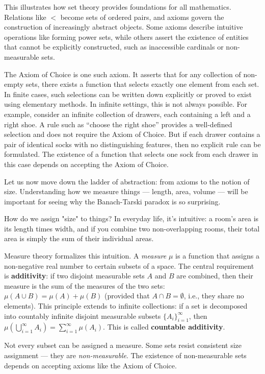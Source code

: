 This illustrates how set theory provides foundations for all mathematics. Relations like $<$ become sets of ordered pairs, and axioms govern the construction of increasingly abstract objects. Some axioms describe intuitive operations like forming power sets, while others assert the existence of entities that cannot be explicitly constructed, such as inaccessible cardinals or non-measurable sets.

The Axiom of Choice is one such axiom. It asserts that for any collection of non-empty sets, there exists a function that selects exactly one element from each set. In finite cases, such selections can be written down explicitly or proved to exist using elementary methods. In infinite settings, this is not always possible. For example, consider an infinite collection of drawers, each containing a left and a right shoe. A rule such as “choose the right shoe” provides a well-defined selection and does not require the Axiom of Choice. But if each drawer contains a pair of identical socks with no distinguishing features, then no explicit rule can be formulated. The existence of a function that selects one sock from each drawer in this case depends on accepting the Axiom of Choice.

Let us now move down the ladder of abstraction: from axioms to the notion of size. Understanding how we measure things — length, area, volume — will be important for seeing why the Banach-Tarski paradox is so surprising.

How do we assign "size" to things? In everyday life, it's intuitive: a room's area is its length times width, and if you combine two non-overlapping rooms, their total area is simply the sum of their individual areas. 

Measure theory formalizes this intuition. A \emph{measure} $\mu$ is a function that assigns a non-negative real number to certain subsets of a space. The central requirement is \textbf{additivity}: if two disjoint measurable sets $A$ and $B$ are combined, then their measure is the sum of the measures of the two sets: $\mu(A \cup B) = \mu(A) + \mu(B)$ (provided that $A \cap B = \emptyset$, i.e., they share no elements). This principle extends to infinite collections: if a set is decomposed into countably infinite disjoint measurable subsets $\{A_i\}_{i=1}^\infty$, then $\mu\left( \bigcup_{i=1}^\infty A_i \right) = \sum_{i=1}^\infty \mu(A_i)$. This is called \textbf{countable additivity}.

Not every subset can be assigned a measure. Some sets resist consistent size assignment — they are \emph{non-measurable}. The existence of non-measurable sets depends on accepting axioms like the Axiom of Choice.

